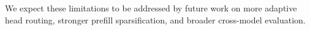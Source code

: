 \documentclass{llmxive}
\providecommand{\name}{{\textsc{RTPurbo}}\xspace}
\begin{document}
We expect these limitations to be addressed by future work on more adaptive head routing, stronger prefill sparsification, and broader cross-model evaluation.




\end{document}
